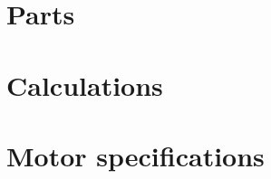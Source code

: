 \documentclass[11pt,twoside,a4paper]{report}
\begin{document}
\begin{appendices}
\chapter{Parts}


\label{appendix:parts}

\chapter{Calculations}



\label{appendix:calculations}
\chapter{Motor specifications}

\label{appendix:motor}

\end{appendices}
\end{document}
